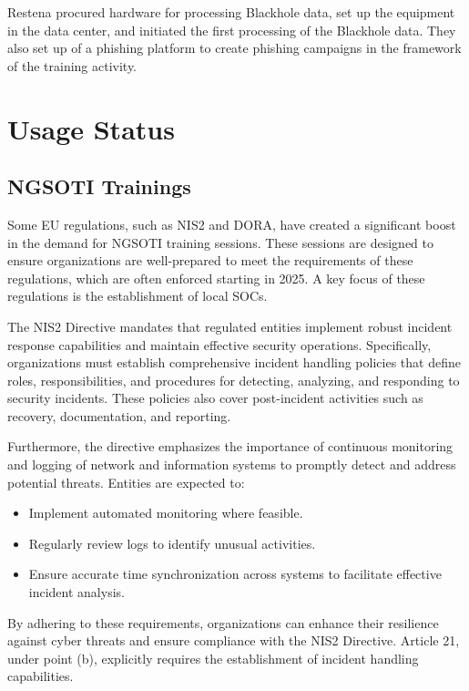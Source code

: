Restena procured hardware for processing Blackhole data, set up the equipment in the data center, and initiated the first processing of the Blackhole data.
They also set up of a phishing platform to create phishing campaigns in the framework of the training activity.

\chapter{Usage Status}

\section{NGSOTI Trainings}\label{training}
Some EU regulations, such as NIS2 and DORA, have created a significant boost in the demand for NGSOTI training sessions. These sessions are designed to ensure organizations are well-prepared to meet the requirements of these regulations, which are often enforced starting in 2025. A key focus of these regulations is the establishment of local SOCs.

The NIS2 Directive mandates that regulated entities implement robust incident response capabilities and maintain effective security operations. Specifically, organizations must establish comprehensive incident handling policies that define roles, responsibilities, and procedures for detecting, analyzing, and responding to security incidents. These policies also cover post-incident activities such as recovery, documentation, and reporting.

Furthermore, the directive emphasizes the importance of continuous monitoring and logging of network and information systems to promptly detect and address potential threats. Entities are expected to:

\begin{itemize}
	\item Implement automated monitoring where feasible.
	\item Regularly review logs to identify unusual activities.
	\item Ensure accurate time synchronization across systems to facilitate effective incident analysis.
\end{itemize}

By adhering to these requirements, organizations can enhance their resilience against cyber threats and ensure compliance with the NIS2 Directive. Article 21, under point (b), explicitly requires the establishment of incident handling capabilities.

